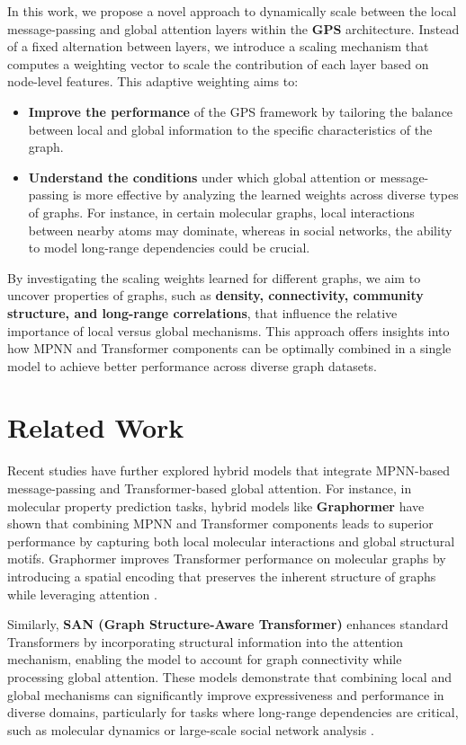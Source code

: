 \documentclass{acmart}
\begin{document}
In this work, we propose a novel approach to dynamically scale between the local message-passing and global attention layers within the \textbf{GPS} architecture. Instead of a fixed alternation between layers, we introduce a scaling mechanism that computes a weighting vector to scale the contribution of each layer based on node-level features. This adaptive weighting aims to:

\begin{itemize}
    \item \textbf{Improve the performance} of the GPS framework by tailoring the balance between local and global information to the specific characteristics of the graph.
    \item \textbf{Understand the conditions} under which global attention or message-passing is more effective by analyzing the learned weights across diverse types of graphs. For instance, in certain molecular graphs, local interactions between nearby atoms may dominate, whereas in social networks, the ability to model long-range dependencies could be crucial.
\end{itemize}

By investigating the scaling weights learned for different graphs, we aim to uncover properties of graphs, such as \textbf{density, connectivity, community structure, and long-range correlations}, that influence the relative importance of local versus global mechanisms. This approach offers insights into how MPNN and Transformer components can be optimally combined in a single model to achieve better performance across diverse graph datasets.

\section{Related Work}

Recent studies have further explored hybrid models that integrate MPNN-based message-passing and Transformer-based global attention. For instance, in molecular property prediction tasks, hybrid models like \textbf{Graphormer} \cite{Ying2021,Shi2022} have shown that combining MPNN and Transformer components leads to superior performance by capturing both local molecular interactions and global structural motifs. Graphormer improves Transformer performance on molecular graphs by introducing a spatial encoding that preserves the inherent structure of graphs while leveraging attention \cite{Vaswani2017,Gilmer2017}.

Similarly, \textbf{SAN (Graph Structure-Aware Transformer)} \cite{Kreuzer2021} enhances standard Transformers by incorporating structural information into the attention mechanism, enabling the model to account for graph connectivity while processing global attention. These models demonstrate that combining local and global mechanisms can significantly improve expressiveness and performance in diverse domains, particularly for tasks where long-range dependencies are critical, such as molecular dynamics or large-scale social network analysis \cite{Bacciu2020}.
\end{document}

